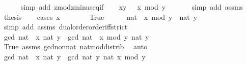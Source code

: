 \begin{isabellebody}
\ \ \ \ \isamarkupfalse%
\ {\isacharparenleft}{\kern0pt}simp\ add{\isacharcolon}{\kern0pt}\ zmod{\isacharunderscore}{\kern0pt}zminus{}{\isacharunderscore}{\kern0pt}eq{\isacharunderscore}{\kern0pt}if{\isacharparenright}{\kern0pt}\isanewline
\ \ \isamarkupfalse%
\ xy{\isacharcolon}{\kern0pt}\ {\isachardoublequoteopen}{}\ {\isasymle}\ x\ mod\ y{\isachardoublequoteclose}\ \isanewline
\ \ \ \ \isamarkupfalse%
\ {\isacharparenleft}{\kern0pt}simp\ add{\isacharcolon}{\kern0pt}\ assms{\isacharparenright}{\kern0pt}\isanewline
\ \ \isamarkupfalse%
\ {\isacharquery}{\kern0pt}thesis\isanewline
\ \ \isamarkupfalse%
\ {\isacharparenleft}{\kern0pt}cases\ {\isachardoublequoteopen}x\ {\isacharless}{\kern0pt}\ {}{\isachardoublequoteclose}{\isacharparenright}{\kern0pt}\isanewline
\ \ \ \ \isamarkupfalse%
\ True\isanewline
\ \ \ \ \isamarkupfalse%
\ {\isachardoublequoteopen}nat\ {\isacharparenleft}{\kern0pt}{\isacharminus}{\kern0pt}\ x\ mod\ y{\isacharparenright}{\kern0pt}\ {\isasymle}\ nat\ y{\isachardoublequoteclose}\isanewline
\ \ \ \ \ \ \isamarkupfalse%
\ {\isacharparenleft}{\kern0pt}simp\ add{\isacharcolon}{\kern0pt}\ assms\ dual{\isacharunderscore}{\kern0pt}order{\isachardot}{\kern0pt}order{\isacharunderscore}{\kern0pt}iff{\isacharunderscore}{\kern0pt}strict{\isacharparenright}{\kern0pt}\isanewline
\ \ \ \ \isamarkupfalse%
\ \isamarkupfalse%
\ {\isachardoublequoteopen}gcd\ {\isacharparenleft}{\kern0pt}nat\ {\isacharparenleft}{\kern0pt}{\isacharminus}{\kern0pt}\ x{\isacharparenright}{\kern0pt}{\isacharparenright}{\kern0pt}\ {\isacharparenleft}{\kern0pt}nat\ y{\isacharparenright}{\kern0pt}\ {\isacharequal}{\kern0pt}\ gcd\ {\isacharparenleft}{\kern0pt}nat\ {\isacharparenleft}{\kern0pt}{\isacharminus}{\kern0pt}\ x\ mod\ y{\isacharparenright}{\kern0pt}{\isacharparenright}{\kern0pt}\ {\isacharparenleft}{\kern0pt}nat\ y{\isacharparenright}{\kern0pt}{\isachardoublequoteclose}\isanewline
\ \ \ \ \ \ \isamarkupfalse%
\ True\ assms\ gcd{\isacharunderscore}{\kern0pt}non{\isacharunderscore}{\kern0pt}{}{\isacharunderscore}{\kern0pt}nat\ nat{\isacharunderscore}{\kern0pt}mod{\isacharunderscore}{\kern0pt}distrib\ \isamarkupfalse%
\ auto\isanewline
\ \ \ \ \isamarkupfalse%
\ \isamarkupfalse%
\ {\isachardoublequoteopen}gcd\ {\isacharparenleft}{\kern0pt}nat\ {\isacharparenleft}{\kern0pt}{\isacharminus}{\kern0pt}\ x{\isacharparenright}{\kern0pt}{\isacharparenright}{\kern0pt}\ {\isacharparenleft}{\kern0pt}nat\ y{\isacharparenright}{\kern0pt}\ {\isacharequal}{\kern0pt}\ gcd\ {\isacharparenleft}{\kern0pt}nat\ y{\isacharparenright}{\kern0pt}\ {\isacharparenleft}{\kern0pt}nat\ {\isacharparenleft}{\kern0pt}x\ mod\ y{\isacharparenright}{\kern0pt}{\isacharparenright}{\kern0pt}{\isachardoublequoteclose}\isanewline

\end{isabellebody}
